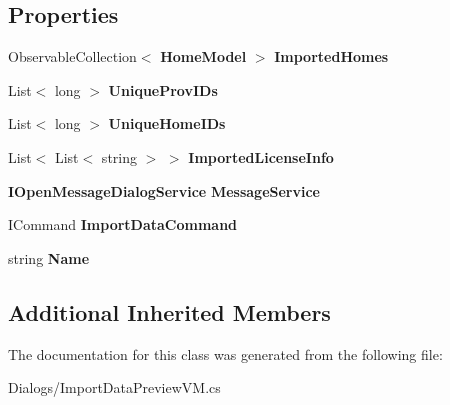 \subsection*{Properties}
\begin{DoxyCompactItemize}
\item 
\mbox{\label{class_a_f_h___scheduler_1_1_dialogs_1_1_import_data_preview_v_m_add4f33cd9f3505c5f851dc1df4f4c0d4}} 
Observable\+Collection$<$ \textbf{ Home\+Model} $>$ {\bfseries Imported\+Homes}\hspace{0.3cm}{\ttfamily  [get, set]}
\item 
\mbox{\label{class_a_f_h___scheduler_1_1_dialogs_1_1_import_data_preview_v_m_a7ac560b1d9f1406557c33a3d79bb663a}} 
List$<$ long $>$ {\bfseries Unique\+Prov\+I\+Ds}\hspace{0.3cm}{\ttfamily  [get, set]}
\item 
\mbox{\label{class_a_f_h___scheduler_1_1_dialogs_1_1_import_data_preview_v_m_a34e7ce0fb00f961b820db4e3329746b3}} 
List$<$ long $>$ {\bfseries Unique\+Home\+I\+Ds}\hspace{0.3cm}{\ttfamily  [get, set]}
\item 
\mbox{\label{class_a_f_h___scheduler_1_1_dialogs_1_1_import_data_preview_v_m_a71be2d4f49dbd7801d96f1d2ff583057}} 
List$<$ List$<$ string $>$ $>$ {\bfseries Imported\+License\+Info}\hspace{0.3cm}{\ttfamily  [get, set]}
\item 
\mbox{\label{class_a_f_h___scheduler_1_1_dialogs_1_1_import_data_preview_v_m_a4fe671520c03e3e110c6977328b89e5a}} 
\textbf{ I\+Open\+Message\+Dialog\+Service} {\bfseries Message\+Service}\hspace{0.3cm}{\ttfamily  [get]}
\item 
\mbox{\label{class_a_f_h___scheduler_1_1_dialogs_1_1_import_data_preview_v_m_ad40b2159b850f1baa58d0e4da691f2ab}} 
I\+Command {\bfseries Import\+Data\+Command}\hspace{0.3cm}{\ttfamily  [get]}
\item 
\mbox{\label{class_a_f_h___scheduler_1_1_dialogs_1_1_import_data_preview_v_m_a06d3e1318470fb6881a0c2d6bfed7755}} 
string {\bfseries Name}\hspace{0.3cm}{\ttfamily  [get]}
\end{DoxyCompactItemize}
\subsection*{Additional Inherited Members}


The documentation for this class was generated from the following file\+:\begin{DoxyCompactItemize}
\item 
Dialogs/Import\+Data\+Preview\+V\+M.\+cs\end{DoxyCompactItemize}
